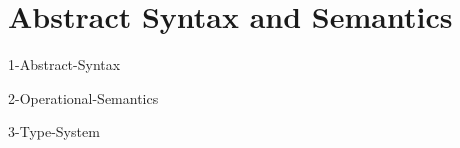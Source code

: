\documentclass[class=article, crop=false]{standalone}
\begin{document}
\section{Abstract Syntax and Semantics}

{1-Abstract-Syntax}

{2-Operational-Semantics}

{3-Type-System}
\end{document}
